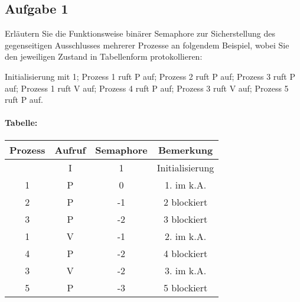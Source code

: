 \subsection*{Aufgabe 1}

Erläutern Sie die Funktionsweise binärer Semaphore zur Sicherstellung des gegenseitigen
Ausschlusses mehrerer Prozesse an folgendem Beispiel, wobei Sie den jeweiligen Zustand
in Tabellenform protokollieren:

Initialisierung mit 1; 
Prozess 1 ruft P auf; 
Prozess 2 ruft P auf; 
Prozess 3 ruft P auf;
Prozess 1 ruft V auf; 
Prozess 4 ruft P auf; 
Prozess 3 ruft V auf; 
Prozess 5 ruft P auf.

\paragraph*{Tabelle:}

\begin{tabular}{ c | c | c | c }
	Prozess  & Aufruf &  Semaphore & Bemerkung\\
	\hline
		&	I 	& 	1		&	Initialisierung		\\
	1	&	P	&	0 		& 	1. im k.A.		\\
	2	&	P	&	-1		&	2 blockiert		\\
	3	&	P	&	-2		& 	3 blockiert		\\
	1	&	V	&	-1		&	2. im k.A.		\\
	4	&	P	&	-2		&	4 blockiert		\\
	3	&	V	&	-2		&	3. im k.A.		\\
	5	&	P	&	-3		&	5 blockiert		\\
	
\end{tabular}

